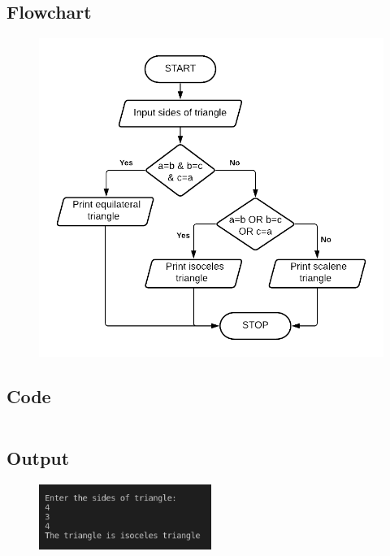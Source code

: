 \documentclass[12pt]{article}
\begin{document}
\subsection{Flowchart}
\begin{figure}[h]
    \centering
    \includegraphics[width=1.0\textwidth]{Flowchart07.png}
\end{figure}
\newpage
\subsection{Code}
\inputminted{c}{q7.c}
\subsection{Output}
\begin{figure}[h]
    \centering
    \includegraphics[width=0.5\textwidth]{7.png}
\end{figure}
\newpage
\section{}
\end{document}

